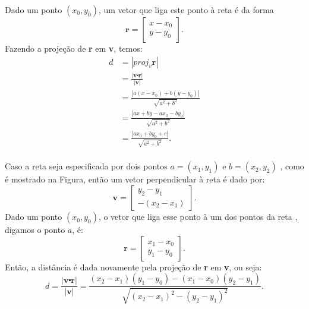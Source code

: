 Dado um ponto $(x_0, y_0)$, um vetor que liga este ponto à reta é da forma
\begin{equation*}
\textbf{r}=\left[ \begin{array}{c} x-x_0\\ y-y_0 \end{array} \right].
\end{equation*}
Fazendo a projeção de \textbf{r} em \textbf{v}, temos:
\begin{equation*}
\begin{aligned}
d&=|proj_v\textbf{r}| \\
&=\frac{|\textbf{v}\centerdot \textbf{r}|}{|\textbf{v}|} \\
&=\frac{|a(x-x_0)+b(y-y_0)|}{\sqrt{a^2+b^2}} \\
&=\frac{|ax+by-ax_0-by_0|}{\sqrt{a^2+b^2}} \\
&=\frac{|ax_0+by_0+c|}{\sqrt{a^2+b^2}}. \\
\end{aligned}
\end{equation*}

Caso a reta seja especificada por dois pontos $a=(x_1, y_1)$ e
$b=(x_2, y_2)$ , como é mostrado na Figura, então um vetor
perpendicular à reta é dado por:
\begin{equation*}
\textbf{v}=\left[ \begin{array}{c} y_2-y_1 \\ -(x_2-x_1) \end{array}\right] .
\end{equation*}
Dado um ponto $(x_0, y_0)$, o vetor que liga esse ponto à um dos pontos da reta
, digamos o ponto $a$, é:
\begin{equation*}
\textbf{r}=\left[ \begin{array}{c} x_1-x_0 \\ y_1-y_0\end{array}\right] .
\end{equation*}
Então, a distância é dada novamente pela projeção de \textbf{r} em \textbf{v},
ou seja:
\begin{equation*}
d =\frac{|\textbf{v}\centerdot \textbf{r}|}{|\textbf{v}|} =
\frac{(x_2-x_1)(y_1-y_0)-(x_1-x_0)(y_2-y_1)}{\sqrt{(x_2-x_1)^2-(y_2-y_1)^2}}.
\end{equation*}
\nocite{point2line}
